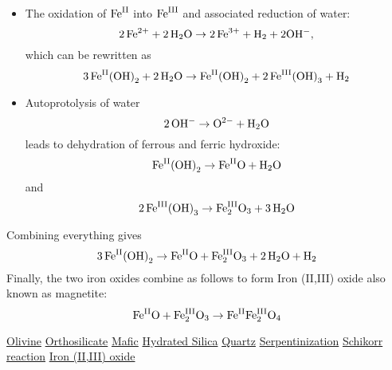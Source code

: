 \documentclass[a4paper,14pt]{extarticle}
\def\H{{\rm H}}
\def\O{{\rm O}}
\def\Fe{{\rm Fe}}
\def\II{{\rm II}}
\def\III{{\rm III}}
\begin{document}
\begin{itemize}
    \item
The oxidation of $\Fe^{\II}$ into $\Fe^{\III}$ and associated reduction of water:
\[
    2\, \Fe^{2+} + 2\, \H_2\O \rightarrow 2\, \Fe^{3+} + \H_2 + 2\O\H^-,
\]
which can be rewritten as
\[
    3\, \Fe^{\II}{(\O\H)}_2 + 2\, \H_2\O \rightarrow \Fe^{\II}{(\O\H)}_2 + 2\, \Fe^{\III}{(\O\H)}_3 + \H_2
\]

    \item
        Autoprotolysis of water
\[
    2\, \O\H^- \rightarrow \O^{2-} + \H_2\O
\]
leads to dehydration of ferrous and ferric hydroxide:
\[
    \Fe^{\II}{(\O\H)}_2 \rightarrow \Fe^{\II}\O + \H_2\O
\]
and
\[
    2\,\Fe^{\III}{(\O\H)}_3 \rightarrow \Fe^{\III}_2\O_3 + 3\,\H_2\O
\]
\end{itemize}
Combining everything gives
\[
    3\, \Fe^{\II}{(\O\H)}_2 \rightarrow \Fe^{\II}\O + \Fe^{\III}_2\O_3 + 2\,\H_2\O + \H_2
\]
Finally, the two iron oxides combine as follows to form Iron (II,III) oxide\cite{iron_ii_iii_oxide} also known as
magnetite:
\[
    \Fe^{\II}\O + \Fe_2^{\III}\O_3 \rightarrow \Fe^{\II}\Fe^{\III}_2\O_4
\]





\begin{thebibliography}{9}
               \href{https://en.wikipedia.org/wiki/Olivine}{Olivine}
         \href{https://en.wikipedia.org/wiki/Orthosilicate}{Orthosilicate}
                 \href{https://en.wikipedia.org/wiki/Mafic}{Mafic}
       \href{https://en.wikipedia.org/wiki/Hydrated_silica}{Hydrated Silica}
                \href{https://en.wikipedia.org/wiki/Quartz}{Quartz}
      \href{https://en.wikipedia.org/wiki/Serpentinization}{Serpentinization}
     \href{https://en.wikipedia.org/wiki/Schikorr_reaction}{Schikorr reaction}
     \href{https://en.wikipedia.org/wiki/Iron(II,III)_oxide}{Iron (II,III) oxide}
\end{thebibliography}
\end{document}
